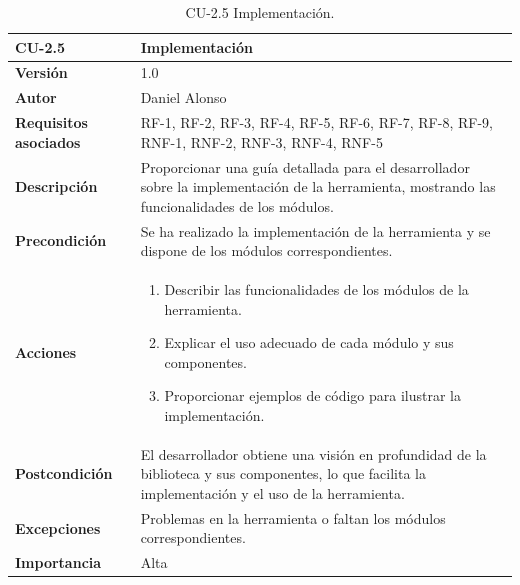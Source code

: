 \begin{table}[h!]
	\centering
	\begin{tabularx}{\linewidth}{ p{} p{} }
		\toprule
		\textbf{CU-2.5}               & \textbf{Implementación}                                                                                                                              \\
		\toprule
		\textbf{Versión}              & 1.0                                                                                                                                                  \\
		\textbf{Autor}                & Daniel Alonso \\
		\textbf{Requisitos asociados} & RF-1, RF-2, RF-3, RF-4, RF-5, RF-6, RF-7, RF-8, RF-9, RNF-1, RNF-2, RNF-3, RNF-4, RNF-5                                                                                                                              \\
		\textbf{Descripción}          & Proporcionar una guía detallada para el desarrollador sobre la implementación de la herramienta, mostrando las funcionalidades de los módulos.       \\
		\textbf{Precondición}         & Se ha realizado la implementación de la herramienta y se dispone de los módulos correspondientes.                                                    \\
		\textbf{Acciones}             & \begin{enumerate}
			                                \item Describir las funcionalidades de los módulos de la herramienta.
			                                \item Explicar el uso adecuado de cada módulo y sus componentes.
			                                \item Proporcionar ejemplos de código para ilustrar la implementación.
		                                \end{enumerate}                                                                                \\
		\textbf{Postcondición}        & El desarrollador obtiene una visión en profundidad de la biblioteca y sus componentes, lo que facilita la implementación y el uso de la herramienta. \\
		\textbf{Excepciones}          & Problemas en la herramienta o faltan los módulos correspondientes.                                                        \\
		\textbf{Importancia}          & Alta                                                                                                                                                 \\
		\bottomrule
	\end{tabularx}
	\caption{CU-2.5 Implementación.}
	\label{tab:cu2.5}
\end{table}

